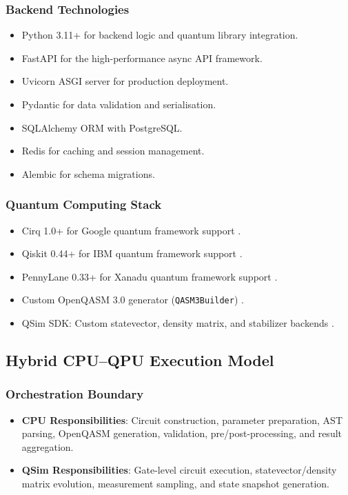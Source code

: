 \subsubsection{Backend Technologies}
\begin{itemize}
    \item Python 3.11+ for backend logic and quantum library integration.
    \item FastAPI for the high-performance async API framework.
    \item Uvicorn ASGI server for production deployment.
    \item Pydantic for data validation and serialisation.
    \item SQLAlchemy ORM with PostgreSQL.
    \item Redis for caching and session management.
    \item Alembic for schema migrations.
\end{itemize}

\subsubsection{Quantum Computing Stack}
\begin{itemize}
    \item Cirq 1.0+ for Google quantum framework support \cite{cirq_developers_2023}.
    \item Qiskit 0.44+ for IBM quantum framework support \cite{qiskit}.
    \item PennyLane 0.33+ for Xanadu quantum framework support \cite{bergholm2018pennylane}.
    \item Custom OpenQASM 3.0 generator (\texttt{QASM3Builder}) \cite{cross2021openqasm}.
    \item QSim SDK: Custom statevector, density matrix, and stabilizer backends \cite{qsim_sdk_2026, nielsen2010quantum}.
\end{itemize}

\subsection{Hybrid CPU--QPU Execution Model}

\subsubsection{Orchestration Boundary}
\begin{itemize}
    \item \textbf{CPU Responsibilities}: Circuit construction, parameter preparation, AST parsing, OpenQASM generation, validation, pre/post-processing, and result aggregation.
    \item \textbf{QSim Responsibilities}: Gate-level circuit execution, statevector/density matrix evolution, measurement sampling, and state snapshot generation.
\end{itemize}

